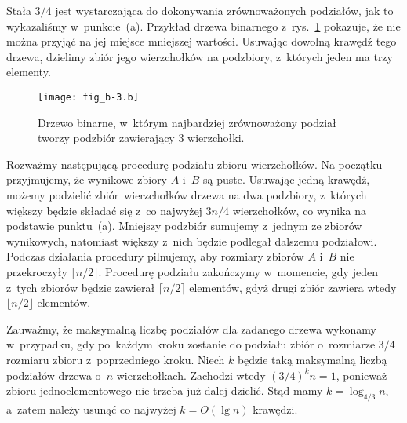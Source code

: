 \subproblem %
Stała $3/4$ jest wystarczająca do dokonywania zrównoważonych podziałów, jak to wykazaliśmy w~punkcie~(a).
Przykład drzewa binarnego z~rys.~\ref{fig:B-3b} pokazuje, że nie można przyjąć na jej miejsce mniejszej wartości.
Usuwając dowolną krawędź tego drzewa, dzielimy zbiór jego wierzchołków na podzbiory, z~których jeden ma trzy elementy.
\begin{figure}[ht]
	\begin{center}
		\texttt{[image: fig\_b-3.b]}
	\end{center}
	\caption{Drzewo binarne, w~którym najbardziej zrównoważony podział tworzy podzbiór zawierający 3 wierzchołki.} \label{fig:B-3b}
\end{figure}

\subproblem %
Rozważmy następującą procedurę podziału zbioru wierzchołków.
Na początku przyjmujemy, że wynikowe zbiory $A$ i~$B$ są puste.
Usuwając jedną krawędź, możemy podzielić  zbiór~wierzchołków drzewa na dwa podzbiory, z~których większy będzie składać się z~co najwyżej $3n/4$ wierzchołków, co wynika na podstawie punktu~(a).
Mniejszy podzbiór sumujemy z~jednym ze zbiorów wynikowych, natomiast większy z~nich będzie podlegał dalszemu podziałowi.
Podczas działania procedury pilnujemy, aby rozmiary zbiorów $A$ i~$B$ nie przekroczyły $\lceil n/2\rceil$.
Procedurę podziału zakończymy w~momencie, gdy jeden z~tych zbiorów będzie zawierał $\lceil n/2\rceil$ elementów, gdyż drugi zbiór zawiera wtedy $\lfloor n/2\rfloor$ elementów.

Zauważmy, że maksymalną liczbę podziałów dla zadanego drzewa wykonamy w~przypadku, gdy po~każdym kroku zostanie do podziału zbiór o~rozmiarze $3/4$ rozmiaru zbioru z~poprzedniego kroku.
Niech $k$ będzie taką maksymalną liczbą podziałów drzewa o~$n$ wierzchołkach.
Zachodzi wtedy $(3/4)^kn=1$, ponieważ zbioru jednoelementowego nie trzeba już dalej dzielić.
Stąd mamy $k=\log_{4/3}n$, a~zatem należy usunąć co najwyżej $k=O(\lg n)$ krawędzi.

\endinput
